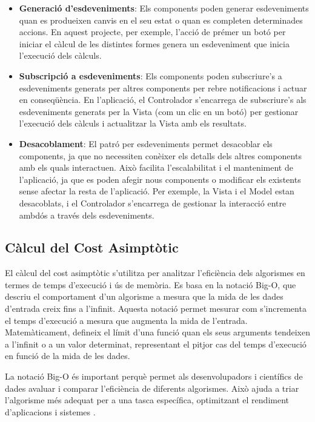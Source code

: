 \documentclass{ieeetj}
\begin{document}
\begin{itemize} 
    \item \textbf{Generació d'esdeveniments}: Els components poden generar esdeveniments quan es produeixen canvis en el seu estat o quan es completen determinades accions. En aquest projecte, per exemple, l'acció de prémer un botó per iniciar el càlcul de les distintes formes genera un esdeveniment que inicia l'execució dels càlculs. 
    \item \textbf{Subscripció a esdeveniments}: Els components poden subscriure's a esdeveniments generats per altres components per rebre notificacions i actuar en conseqüència.
 En l'aplicació, el Controlador s'encarrega de subscriure's als esdeveniments generats per la Vista (com un clic en un botó) per gestionar l'execució dels càlculs i actualitzar la Vista amb els resultats.
\item \textbf{Desacoblament}: El patró per esdeveniments permet desacoblar els components, ja que no necessiten conèixer els detalls dels altres components amb els quals interactuen. Això facilita l'escalabilitat i el manteniment de l'aplicació, ja que es poden afegir nous components o modificar els existents sense afectar la resta de l'aplicació. Per exemple, la Vista i el Model estan desacoblats, i el Controlador s'encarrega de gestionar la interacció entre ambdós a través dels esdeveniments.
\end{itemize}

\subsection{Càlcul del Cost Asimptòtic }
El càlcul del cost asimptòtic s'utilitza per analitzar l'eficiència dels algorismes en termes de temps d'execució i ús de memòria. Es basa en la notació Big-O, que descriu el comportament d'un algorisme a mesura que la mida de les dades d'entrada creix fins a l'infinit. Aquesta notació permet mesurar com s'incrementa el temps d'execució a mesura que augmenta la mida de l'entrada. Matemàticament, defineix el límit d'una funció quan els seus arguments tendeixen a l'infinit o a un valor determinat, representant el pitjor cas del temps d'execució en funció de la mida de les dades.\newline

La notació Big-O és important perquè permet als desenvolupadors i científics de dades avaluar i comparar l'eficiència de diferents algorismes. Això ajuda a triar l'algorisme més adequat per a una tasca específica, optimitzant el rendiment d'aplicacions i sistemes \cite{bigOAnalysis}.
\end{document}

